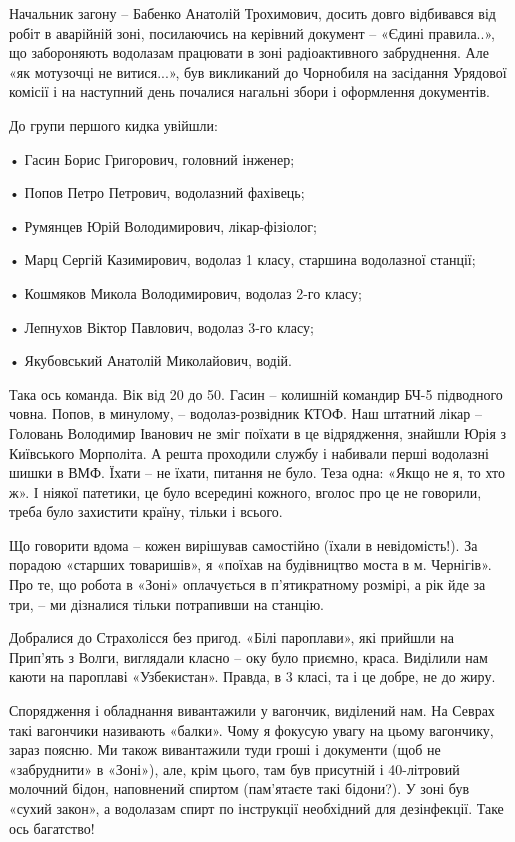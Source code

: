 Начальник загону – Бабенко Анатолій Трохимович, досить довго відбивався від
робіт в аварійній зоні, посилаючись на керівний документ – «Єдині правила..»,
що забороняють водолазам працювати в зоні радіоактивного забруднення. Але «як
мотузочці не витися...», був викликаний до Чорнобиля на засідання Урядової
комісії і на наступний день почалися нагальні збори і оформлення документів.


До групи першого кидка увійшли:

• Гасин Борис Григорович, головний інженер;

• Попов Петро Петрович, водолазний фахівець;

• Румянцев Юрій Володимирович, лікар-фізіолог;

• Марц Сергій Казимирович, водолаз 1 класу, старшина водолазної станції;

• Кошмяков Микола Володимирович, водолаз 2-го класу;

• Лепнухов Віктор Павлович, водолаз 3-го класу;

• Якубовський Анатолій Миколайович, водій.

Така ось команда. Вік від 20 до 50. Гасин – колишній командир БЧ-5 підводного
човна. Попов, в минулому, – водолаз-розвідник КТОФ. Наш штатний лікар –
Головань Володимир Іванович не зміг поїхати в це відрядження, знайшли Юрія з
Київського Морполіта. А решта проходили службу і набивали перші водолазні шишки
в ВМФ. Їхати – не їхати, питання не було. Теза одна: «Якщо не я, то хто ж». І
ніякої патетики, це було всередині кожного, вголос про це не говорили, треба
було захистити країну, тільки і всього.


Що говорити вдома – кожен вирішував самостійно (їхали в невідомість!). За
порадою «старших товаришів», я «поїхав на будівництво моста в м. Чернігів». Про
те, що робота в «Зоні» оплачується в п'ятикратному розмірі, а рік йде за три, –
ми дізналися тільки потрапивши на станцію.

Добралися до Страхолісся без пригод. «Білі пароплави», які прийшли на Прип'ять
з Волги, виглядали класно – оку було приємно, краса. Виділили нам каюти на
пароплаві «Узбекистан». Правда, в 3 класі, та і це добре, не до жиру.


Спорядження і обладнання вивантажили у вагончик, виділений нам. На Севрах такі
вагончики називають «балки». Чому я фокусую увагу на цьому вагончику, зараз
поясню. Ми також вивантажили туди гроші і документи (щоб не «забруднити» в
«Зоні»), але, крім цього, там був присутній і 40-літровий молочний бідон,
наповнений спиртом (пам'ятаєте такі бідони?). У зоні був «сухий закон», а
водолазам спирт по інструкції необхідний для дезінфекції. Таке ось багатство!

